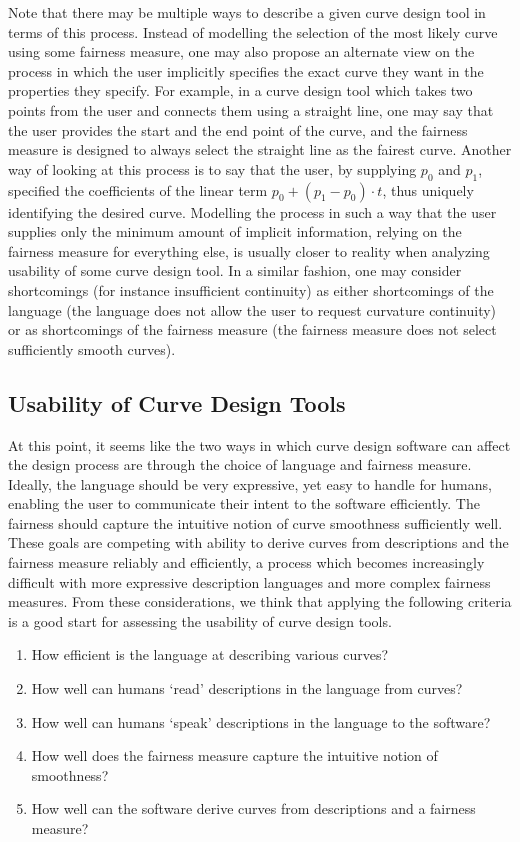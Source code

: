 \documentclass[a4paper]{article}
\begin{document}
			Note that there may be multiple ways to describe a given curve design tool in terms of this process. Instead of modelling the selection of the most likely curve using some fairness measure, one may also propose an alternate view on the process in which the user implicitly specifies the exact curve they want in the properties they specify. For example, in a curve design tool which takes two points from the user and connects them using a straight line, one may say that the user provides the start and the end point of the curve, and the fairness measure is designed to always select the straight line as the fairest curve. Another way of looking at this process is to say that the user, by supplying \(p_0\) and \(p_1\), specified the coefficients of the linear term \(p_0 + (p_1 - p_0) \cdot t\), thus uniquely identifying the desired curve. Modelling the process in such a way that the user supplies only the minimum amount of implicit information, relying on the fairness measure for everything else, is usually closer to reality when analyzing usability of some curve design tool. In a similar fashion, one may consider shortcomings (for instance insufficient continuity) as either shortcomings of the language (the language does not allow the user to request curvature continuity) or as shortcomings of the fairness measure (the fairness measure does not select sufficiently smooth curves).

		\subsection{Usability of Curve Design Tools}
		\label{section:usability_curve_design_tools}

			At this point, it seems like the two ways in which curve design software can affect the design process are through the choice of language and fairness measure. Ideally, the language should be very expressive, yet easy to handle for humans, enabling the user to communicate their intent to the software efficiently. The fairness should capture the intuitive notion of curve smoothness sufficiently well. These goals are competing with ability to derive curves from descriptions and the fairness measure reliably and efficiently, a process which becomes increasingly difficult with more expressive description languages and more complex fairness measures. From these considerations, we think that applying the following criteria is a good start for assessing the usability of curve design tools.

			\begin{enumerate}
				\item How efficient is the language at describing various curves?
				\item How well can humans `read' descriptions in the language from curves?
				\item How well can humans `speak' descriptions in the language to the software?
				\item How well does the fairness measure capture the intuitive notion of smoothness?
				\item How well can the software derive curves from descriptions and a fairness measure?
			\end{enumerate}
\end{document}
